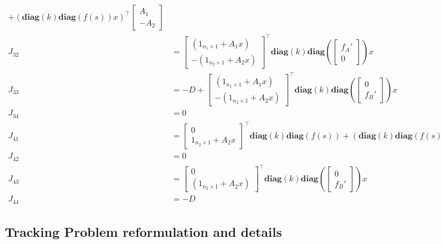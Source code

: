 \documentclass[3p,times]{elsarticle}
\newcommand{\diag}{\textbf{diag}}
\begin{document}
\begin{align}
+  (\diag(k)\diag(f(s))x)^\top \begin{bmatrix}A_1 \\ -A_2\end{bmatrix} \\
J_{32} &= \begin{bmatrix}\left(1_{n_1 \times 1} + A_1x\right)\\ -\left(1_{n_2 \times 1} + A_2x\right)\end{bmatrix}^\top \diag(k) \diag\left( \begin{bmatrix}
f_A' \\ 0\end{bmatrix}\right)x \\
J_{33} &= -D + \begin{bmatrix} \left(1_{n_1 \times 1} + A_1x\right) \\ -\left(1_{n_2\times 1}+ A_2x\right) \end{bmatrix}^\top \diag(k)\diag\left(
\begin{bmatrix}
0 \\ f_B'
\end{bmatrix}\right)x  \\
J_{34} &= 0 \\
J_{41} &= \begin{bmatrix}0 \\ 1_{n_2 \times 1} + A_2x \end{bmatrix}^\top\diag(k) \diag(f(s)) 
+ (\diag(k)\diag(f(s))x)^\top\begin{bmatrix} 
0 \\ A_2
\end{bmatrix} \\
J_{42} &= 0 \\
J_{43} &= \begin{bmatrix} 0 \\(1_{n_2\times 1} + A_2x) \end{bmatrix}^\top \diag(k) \diag\left(\begin{bmatrix}
0 \\ f_B'
\end{bmatrix}\right) x \\
J_{44} &= -D
\end{align}

\subsection{Tracking Problem reformulation and details}
\end{document}

